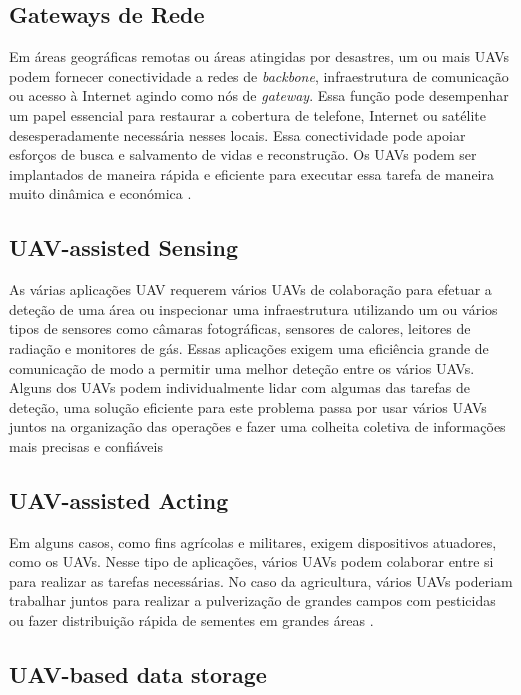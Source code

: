 \subsection{Gateways de Rede}

Em áreas geográficas remotas ou áreas atingidas por desastres, um ou mais UAVs podem fornecer conectividade a redes de \textit{backbone}, infraestrutura de comunicação ou acesso à Internet agindo como nós de \textit{gateway}. Essa função pode desempenhar um papel essencial para restaurar a cobertura de telefone, Internet ou satélite desesperadamente necessária nesses locais. Essa conectividade pode apoiar esforços de busca e salvamento de vidas e reconstrução. Os UAVs podem ser implantados de maneira rápida e eficiente para executar essa tarefa de maneira muito dinâmica e económica \cite{ImadJawhar2017}.

\subsection{UAV-assisted Sensing}

As várias aplicações UAV requerem vários UAVs de colaboração para efetuar a deteção de uma área ou inspecionar uma infraestrutura utilizando um ou vários tipos de sensores como câmaras fotográficas, sensores de calores, leitores de radiação e monitores de gás. Essas aplicações exigem uma eficiência grande de comunicação de modo a permitir uma melhor deteção entre os vários UAVs. Alguns dos UAVs podem individualmente lidar com algumas das tarefas de deteção, uma solução eficiente para este problema passa por usar vários UAVs juntos na organização das operações e fazer uma colheita coletiva de informações mais precisas e confiáveis \cite{ImadJawhar2017}

\subsection{UAV-assisted Acting}

Em alguns casos, como fins agrícolas e militares, exigem dispositivos atuadores, como os UAVs. Nesse tipo de aplicações, vários UAVs podem colaborar entre si para realizar as tarefas necessárias. No caso da agricultura, vários UAVs poderiam trabalhar juntos para realizar a pulverização de grandes campos com pesticidas ou fazer distribuição rápida de sementes em grandes áreas \cite{ImadJawhar2017}.

\subsection{UAV-based data storage}

